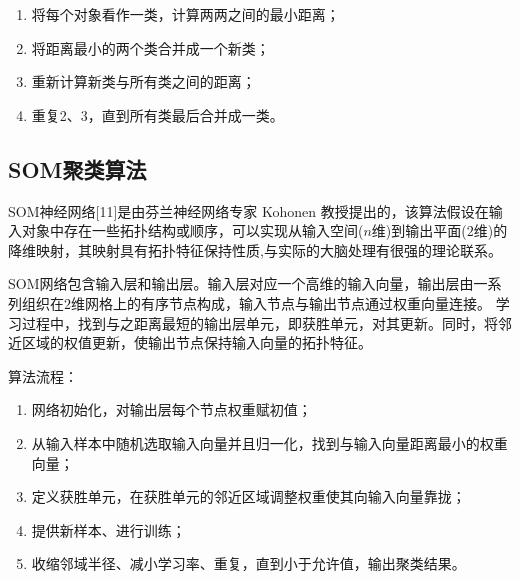 \begin{enumerate}\itemsep0em 
		\item 将每个对象看作一类，计算两两之间的最小距离；
		\item 将距离最小的两个类合并成一个新类；
		\item 重新计算新类与所有类之间的距离；
		\item 重复2、3，直到所有类最后合并成一类。
\end{enumerate}

\subsection{SOM聚类算法}

SOM神经网络[11]是由芬兰神经网络专家 Kohonen 教授提出的，该算法假设在输入对象中存在一些拓扑结构或顺序，可以实现从输入空间($n$维)到输出平面($2$维)的降维映射，其映射具有拓扑特征保持性质,与实际的大脑处理有很强的理论联系。

SOM网络包含输入层和输出层。输入层对应一个高维的输入向量，输出层由一系列组织在$2$维网格上的有序节点构成，输入节点与输出节点通过权重向量连接。 学习过程中，找到与之距离最短的输出层单元，即获胜单元，对其更新。同时，将邻近区域的权值更新，使输出节点保持输入向量的拓扑特征。

算法流程：

\begin{enumerate}\itemsep0em 
		\item 网络初始化，对输出层每个节点权重赋初值；
		\item 从输入样本中随机选取输入向量并且归一化，找到与输入向量距离最小的权重向量；
		\item 定义获胜单元，在获胜单元的邻近区域调整权重使其向输入向量靠拢；
		\item 提供新样本、进行训练；
		\item 收缩邻域半径、减小学习率、重复，直到小于允许值，输出聚类结果。
\end{enumerate}
